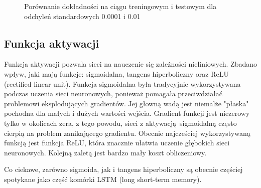 \documentclass{article}
\begin{document}
\begin{figure}[H]
  \centering
\caption{Porównanie dokładności na ciągu treningowym i testowym dla odchyleń standardowych 0.0001 i 0.01}
\end{figure}

\pagebreak
\subsection{Funkcja aktywacji}
Funkcja aktywacji pozwala sieci na nauczenie się zależności nieliniowych.
Zbadano wpływ, jaki mają funkcje: sigmoidalna, tangens hiperboliczny oraz ReLU (rectified linear unit).
Funkcja sigmoidalna była tradycyjnie wykorzystywana podczas uczenia sieci neuronowych, ponieważ pomagała przeciwdziałać problemowi eksplodujących gradientów.
Jej głowną wadą jest niemalże "płaska" pochodna dla małych i dużych wartości wejścia.
Gradient funkcji jest niezerowy tylko w okolicach zera, z tego powodu, sieci z aktywacją sigmoidalną często cierpią na problem zanikającego gradientu.
Obecnie najcześciej wykorzystywaną funkcją jest funkcja ReLU, która 
znacznie ułatwia uczenie głębokich sieci neuronowych. Kolejną zaletą jest bardzo mały koszt obliczeniowy. 

Co ciekawe, zarówno sigmoida, jak i tangens hiperboliczny są obecnie częściej spotykane jako część komórki LSTM (long short-term memory).
\end{document}
